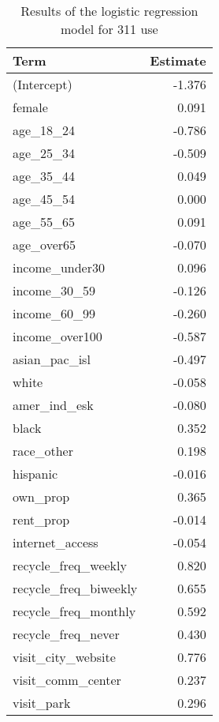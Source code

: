 \begin{table}[h!]

\caption{\label{tab:}Results of the logistic regression model for 311 use}
\centering
\begin{tabular}[t]{lr}
\toprule
\textbf{Term} & \textbf{Estimate}\\
\midrule
(Intercept) & -1.376\\
female & 0.091\\
age\_18\_24 & -0.786\\
age\_25\_34 & -0.509\\
age\_35\_44 & 0.049\\
\addlinespace
age\_45\_54 & 0.000\\
age\_55\_65 & 0.091\\
age\_over65 & -0.070\\
income\_under30 & 0.096\\
income\_30\_59 & -0.126\\
\addlinespace
income\_60\_99 & -0.260\\
income\_over100 & -0.587\\
asian\_pac\_isl & -0.497\\
white & -0.058\\
amer\_ind\_esk & -0.080\\
\addlinespace
black & 0.352\\
race\_other & 0.198\\
hispanic & -0.016\\
own\_prop & 0.365\\
rent\_prop & -0.014\\
\addlinespace
internet\_access & -0.054\\
recycle\_freq\_weekly & 0.820\\
recycle\_freq\_biweekly & 0.655\\
recycle\_freq\_monthly & 0.592\\
recycle\_freq\_never & 0.430\\
\addlinespace
visit\_city\_website & 0.776\\
visit\_comm\_center & 0.237\\
visit\_park & 0.296\\
\bottomrule
\end{tabular}
\end{table}